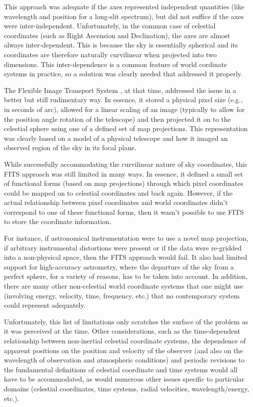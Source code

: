 \documentclass[final,authoryear,5p,times,twocolumn]{elsarticle}
\begin{document}
This approach was adequate if the axes represented independent
quantities (like wavelength and position for a long-slit spectrum),
but did not suffice if the axes were inter-independent. Unfortunately,
in the common case of celestial coordinates (such as Right Ascension
and Declination), the axes are almost always inter-dependent. This is
because the sky is essentially spherical and its coordinates are
therefore naturally curvilinear when projected into two
dimensions. This inter-dependence is a common feature of world
cordinate systems in practice, so a solution was clearly needed that
addressed it properly.

The Flexible Image Transport System
\citep[FITS;][]{1981A&AS...44..363W,1995ASPC...77..233G}, at that
time, addressed the issue in a better but still rudimentary way. In
essence, it stored a physical pixel size (e.g., in seconds of arc),
allowed for a linear scaling of an image (typically to allow for the
position angle rotation of the telescope) and then projected it on to
the celestial sphere using one of a defined set of map
projections. This representation was clearly based on a model of a
physical telescope and how it imaged an observed region of the sky in
its focal plane.

While successfully accommodating the curvilinear nature of sky
coordinates, this FITS approach was still limited in many ways. In
essence, it defined a small set of functional forms (based on map
projections) through which pixel coordinates could be mapped on to
celestial coordinates and back again. However, if the actual
relationship between pixel coordinates and world coordinates didn't
correspond to one of these functional forms, then it wasn't possible
to use FITS to store the coordinate information.

For instance, if astronomical instrumentation were to use a novel map
projection, if arbitrary instrumental distortions were present or if
the data were re-gridded into a non-physical space, then the FITS
approach would fail. It also had limited support for high-accuracy
astrometry, where the departure of the sky from a perfect sphere, for
a variety of reasons, has to be taken into account. In addition, there
are many other non-celestial world coordinate systems that one might
use (involving energy, velocity, time, frequency, etc.) that no
contemporary system could represent adequately.

Unfortunately, this list of limitations only scratches the surface of
the problem as it was perceived at the time. Other considerations,
such as the time-dependent relationship between non-inertial celestial
coordinate systems, the dependence of apparent positions on the
position and velocity of the observer (and also on the wavelength of
observation and atmospheric conditions) and periodic revisions to the
fundamental definitions of celestial coordinate and time systems would
all have to be accommodated, as would numerous other issues specific
to particular domains (celestial coordinates, time systems, radial
velocities, wavelength/energy, etc.).
\end{document}
